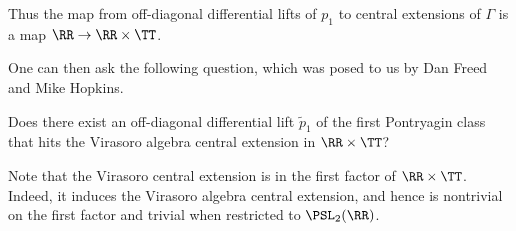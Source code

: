 Thus the map from off-diagonal differential lifts of $p_1$ to central extensions of $\Gamma$ is a map $\RR\to\RR\times\TT$. 

One can then ask the following question, 
which was posed to us by Dan Freed and Mike Hopkins.
\begin{quest}
Does there exist an off-diagonal differential lift $\tilde{p}_1$ of the first Pontryagin class that hits the Virasoro algebra central extension in $\RR\times\TT$?
\end{quest}

Note that the Virasoro central extension is in the first factor of $\RR\times\TT$.  
Indeed, it induces the Virasoro algebra central
extension, and hence is nontrivial on the first factor and trivial when restricted to $\PSL_2(\RR)$.








